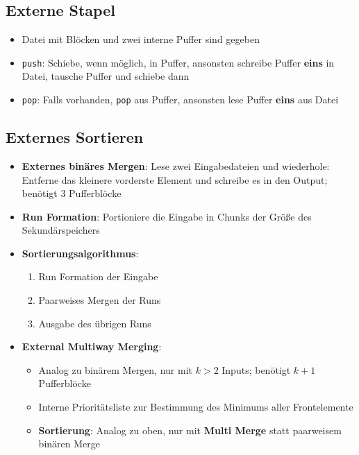 \documentclass[10pt,a4paper]{article}
\begin{document}
	\subsection{Externe Stapel}
	\label{ea:sub:externe_stapel}

	\begin{itemize}
		\item Datei mit Blöcken und zwei interne Puffer sind gegeben
		\item \texttt{push}: Schiebe, wenn möglich, in Puffer, ansonsten schreibe Puffer \textbf{eins} in Datei, tausche Puffer und schiebe dann
		\item \texttt{pop}: Falls vorhanden, \texttt{pop} aus Puffer, ansonsten lese Puffer \textbf{eins} aus Datei
	\end{itemize}	

	\subsection{Externes Sortieren}
	\label{ea:sub:externes_sortieren}

	\begin{itemize}
		\item \textbf{Externes binäres Mergen}: Lese zwei Eingabedateien und wiederhole: Entferne das kleinere vorderste Element und schreibe es in den Output; benötigt 3 Pufferblöcke
		\item \textbf{Run Formation}: Portioniere die Eingabe in Chunks der Größe des Sekundärspeichers
		\item \textbf{Sortierungsalgorithmus}:
		\begin{enumerate}
			\item Run Formation der Eingabe
			\item Paarweises Mergen der Runs
			\item Ausgabe des übrigen Runs
		\end{enumerate}
		\item \textbf{External Multiway Merging}:
		\begin{itemize}
			\item Analog zu binärem Mergen, nur mit $k > 2$ Inputs; benötigt $k + 1$ Pufferblöcke
			\item Interne Prioritätsliste zur Bestimmung des Minimums aller Frontelemente
			\item \textbf{Sortierung}: Analog zu oben, nur mit \textbf{Multi Merge} statt paarweisem binären Merge
		\end{itemize}
	\end{itemize}	
\end{document}
